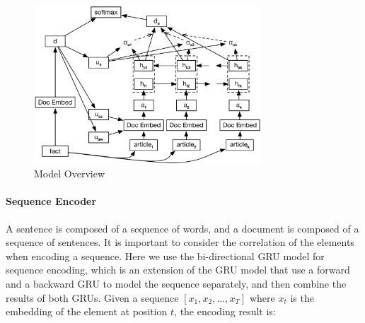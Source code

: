 \begin{figure}[htbp]
\begin{center}
\includegraphics[width=8.5cm]{figures/whole_framework.png}	
\caption{Model Overview}
\label{fig_model_framework}
\end{center}
\end{figure}


\paragraph{Sequence Encoder} 
A sentence is composed of a sequence of words, and a document is composed of a sequence of sentences. It is important to consider the correlation of the elements when encoding a sequence. Here we use the bi-directional GRU model  for sequence encoding, which is an extension of the GRU model \cite{cho2014learning} that use a forward and a backward GRU to model the sequence separately, and then combine the results of both GRUs. Given a sequence $[x_1, x_2, ..., x_T]$ where $x_t$ is the embedding of the element at position $t$, the encoding result is:

